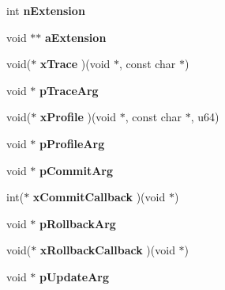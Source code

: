 \begin{DoxyCompactItemize}
\item 
\hypertarget{structsqlite3_aa57fc38ef27d8fa59221cb5c0e54f7fb}{int {\bfseries n\+Extension}}\label{structsqlite3_aa57fc38ef27d8fa59221cb5c0e54f7fb}

\item 
\hypertarget{structsqlite3_aa97954113d8e35c97f8a3af534703f7b}{void $\ast$$\ast$ {\bfseries a\+Extension}}\label{structsqlite3_aa97954113d8e35c97f8a3af534703f7b}

\item 
\hypertarget{structsqlite3_ae438713860c36ad393eb28702b67fec5}{void($\ast$ {\bfseries x\+Trace} )(void $\ast$, const char $\ast$)}\label{structsqlite3_ae438713860c36ad393eb28702b67fec5}

\item 
\hypertarget{structsqlite3_ae0920576e4e92f1b736255fcfad649d1}{void $\ast$ {\bfseries p\+Trace\+Arg}}\label{structsqlite3_ae0920576e4e92f1b736255fcfad649d1}

\item 
\hypertarget{structsqlite3_aa02bf4f3ffdaf52d43a3668661903ffb}{void($\ast$ {\bfseries x\+Profile} )(void $\ast$, const char $\ast$, u64)}\label{structsqlite3_aa02bf4f3ffdaf52d43a3668661903ffb}

\item 
\hypertarget{structsqlite3_a931c234df9b701c78de38ddf22869062}{void $\ast$ {\bfseries p\+Profile\+Arg}}\label{structsqlite3_a931c234df9b701c78de38ddf22869062}

\item 
\hypertarget{structsqlite3_a355237725d3a535d702815b6ef8be75e}{void $\ast$ {\bfseries p\+Commit\+Arg}}\label{structsqlite3_a355237725d3a535d702815b6ef8be75e}

\item 
\hypertarget{structsqlite3_a1b12d797fb7f9c526ffb6665a7f42203}{int($\ast$ {\bfseries x\+Commit\+Callback} )(void $\ast$)}\label{structsqlite3_a1b12d797fb7f9c526ffb6665a7f42203}

\item 
\hypertarget{structsqlite3_a3215967241f15d4599132a8dc2adfb93}{void $\ast$ {\bfseries p\+Rollback\+Arg}}\label{structsqlite3_a3215967241f15d4599132a8dc2adfb93}

\item 
\hypertarget{structsqlite3_ad09cbc96e3c4e322c1722b8c16b9cf24}{void($\ast$ {\bfseries x\+Rollback\+Callback} )(void $\ast$)}\label{structsqlite3_ad09cbc96e3c4e322c1722b8c16b9cf24}

\item 
\hypertarget{structsqlite3_ab4269aa44fea9906fe94045336f13d2a}{void $\ast$ {\bfseries p\+Update\+Arg}}\label{structsqlite3_ab4269aa44fea9906fe94045336f13d2a}


\end{DoxyCompactItemize}
